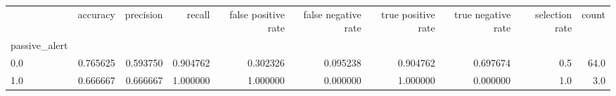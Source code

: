 \begin{tabular}{lrrrrrrrrr}
\toprule
{} &  accuracy &  precision &    recall &  false positive rate &  false negative rate &  true positive rate &  true negative rate &  selection rate &  count \\
passive\_alert &           &            &           &                      &                      &                     &                     &                 &        \\
\midrule
0.0           &  0.765625 &   0.593750 &  0.904762 &             0.302326 &             0.095238 &            0.904762 &            0.697674 &             0.5 &   64.0 \\
1.0           &  0.666667 &   0.666667 &  1.000000 &             1.000000 &             0.000000 &            1.000000 &            0.000000 &             1.0 &    3.0 \\
\bottomrule
\end{tabular}
